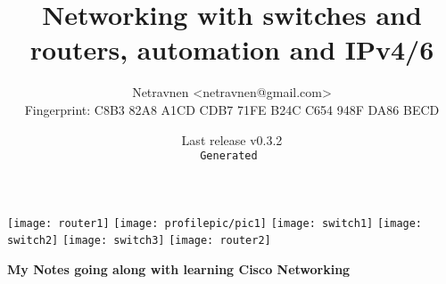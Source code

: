 
\title{Networking with switches and routers, automation and IPv4/6}
\def\thesubject{My Notes going along with learning Cisco Networking}

\author{Netravnen <netravnen@gmail.com>\\
    Fingerprint: C8B3 82A8 A1CD CDB7 71FE  B24C C654 948F DA86 BECD}

\def\theversion{v0.3.2}
\date{{\footnotesize Last release \theversion\\%
    \texttt{\color{Gray}Generated \utccurrenttime}}}

\begin{titlepage}
    \centering
    \texttt{[image: router1]}
    \texttt{[image: profilepic/pic1]}
    \texttt{[image: switch1]}
    \texttt{[image: switch2]}
    \texttt{[image: switch3]}
    \texttt{[image: router2]}\par\vspace{1cm}
    {\scshape\Large \thetitle\par}
    \vspace{1.5cm}
    {\huge\bfseries \thesubject\par}
    \vspace{2cm}
    {\Large\itshape \theauthor\par}
    
    \vfill
    
    {\large \thedate\par}
\end{titlepage}
